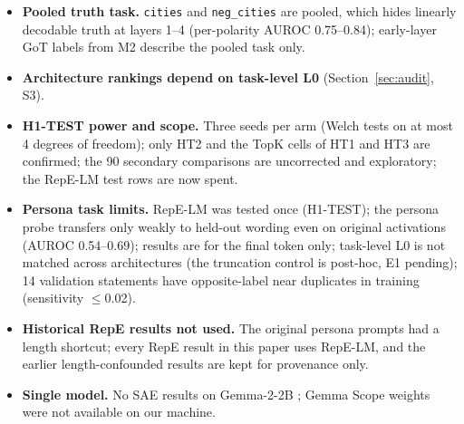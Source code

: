 \begin{itemize}
        loses as large a share of its signal, and GPT-2 Small shows no behavioural honesty effect on the next token.
        The persona results measure instruction-token retention, not honesty.
  \item \textbf{Pooled truth task.} \texttt{cities} and \texttt{neg\_cities} are pooled, which hides linearly
        decodable truth at layers 1--4 (per-polarity AUROC 0.75--0.84); early-layer GoT labels from M2 describe the
        pooled task only.
  \item \textbf{Architecture rankings depend on task-level L0} (Section~\ref{sec:audit}, S3).
  \item \textbf{H1-TEST power and scope.} Three seeds per arm (Welch tests on at most 4 degrees of freedom); only HT2
        and the TopK cells of HT1 and HT3 are confirmed; the 90 secondary comparisons are uncorrected and
        exploratory; the RepE-LM test rows are now spent.
  \item \textbf{Persona task limits.} RepE-LM was tested once (H1-TEST); the persona probe transfers only weakly to held-out
        wording even on original activations (AUROC 0.54--0.69); results are for the final token only; task-level L0
        is not matched across architectures (the truncation control is post-hoc, E1 pending); 14 validation statements
        have opposite-label near duplicates in training (sensitivity $\le$0.02).
  \item \textbf{Historical RepE results not used.} The original persona prompts had a length shortcut; every RepE
        result in this paper uses RepE-LM, and the earlier length-confounded results are kept for provenance only.
  \item \textbf{Single model.} No SAE results on Gemma-2-2B \citep{gemmateam2024gemma2}; Gemma Scope weights were
        not available on our machine.
\end{itemize}
